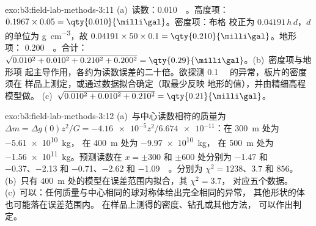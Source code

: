 \begin{solution}{exo:b3:field-lab-methods-3:11}
(a)~读数：\qty{0.010}{\milli\gal}。高度项：
$0.1967\times0.05 = \qty{0.010}{\milli\gal}$。密度项：布格
校正为 $0.04191\,h\,d$，$d$ 的单位为 \unit{g.cm^{-3}}，故
$0.04191\times50\times0.1 = \qty{0.210}{\milli\gal}$。地形项：
\qty{0.200}{\milli\gal}。合计：$\sqrt{0.010^2 + 0.010^2 + 0.210^2 +
0.200^2} = \qty{0.29}{\milli\gal}$。(b)~密度项与地形项
起主导作用，各约为读数误差的二十倍。欲探测
\qty{0.1}{\milli\gal} 的异常，板片的密度须在
样品上测定，或通过数据拟合确定（取最少反映
地形的值），并由精细高程模型做。
(c)~$\sqrt{0.010^2 + 0.010^2 + 0.210^2} = \qty{0.21}{\milli\gal}$。
\end{solution}

\begin{solution}{exo:b3:field-lab-methods-3:12}
(a)~与中心读数相符的质量为 $\Delta m = \Delta g(0)z^2/G
= \num{-4.16e-5}z^2/\num{6.674e-11}$：在 \qty{300}{m} 处为 \qty{-5.61e10}{kg}，
在 \qty{400}{m} 处为 \qty{-9.97e10}{kg}，
在 \qty{500}{m} 处为 \qty{-1.56e11}{kg}。预测读数在 $x = \pm300$ 和 $\pm600$ 处分别为
\num{-1.47} 和 \num{-0.37}、\num{-2.13} 和 \num{-0.71}、\num{-2.62}
和 \qty{-1.09}{\milli\gal}。分别为 $\chi^2 = 1238$、$3.7$ 和
$856$。(b)~只有 \qty{400}{m} 处的模型在误差范围内拟合，其 $\chi^2 = 3.7$，
对应五个数据。(c)~可以：任何质量与中心相同的球对称体给出完全相同的异常，
其他形状的体也可能落在误差范围内。
在样品上测得的密度、钻孔或其他方法，
可以作出判定。
\end{solution}

